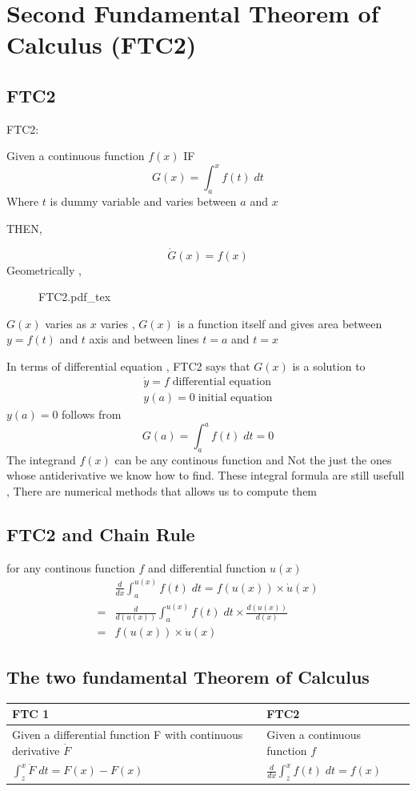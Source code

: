 \section{Second Fundamental Theorem of Calculus (FTC2)} 

\subsection{FTC2}
FTC2:

Given a continuous function $f(x)$ IF 
   \[
	G(x) = \int_{a}^{x} f(t) \; dt 
   \]
   Where $t$ is dummy variable and varies between $a$ and $x$ 

   THEN,

      \[
   	\dot{G}(x) = f(x)
      \]
      Geometrically , 
\begin{figure}[H]
	\centering
	\def\svgwidth{0.7\columnwidth}
	{FTC2.pdf_tex}
\end{figure}
$G(x)$ varies as $x$ varies , $G(x)$ is a function itself and gives 
area between $y =  f(t)$ and $t$ axis and between lines $t=a$ and $t=x$

In terms of differential equation , 
FTC2 says that $G(x)$ is a solution to 
   \begin{align*}
	\dot{y} = f \; \text{differential equation} \\
	y(a) = 0 \; \text{initial equation} 
   \end{align*}
   $y(a)= 0 $ follows from 
      \[
   	G(a) = \int_{a}^{a} f(t) \; dt = 0
      \]
The integrand $f(x)$ can be any continous function and Not  the just the 
ones whose antiderivative we know how to find. These integral formula are still usefull ,
There are numerical methods that allows us to compute them

\subsection{FTC2 and Chain Rule}
for any continous function $f$ and differential function $u(x)$ 
\begin{align*}
    &\frac{d}{dx} \int_{a}^{u(x)} f(t) \; dt = f(u(x)) \times \dot{u}(x) \\
    =& \frac{d}{d(u(x))} \int_{a}^{u(x)} f(t) \; dt \times \frac{d(u(x))}{d(x)}\\
    =& f(u(x)) \times \dot{u}(x)
\end{align*}

\subsection{The two fundamental Theorem of Calculus}
\begin{tabular}{l|l}
	\toprule
	FTC 1 & FTC2 \\
	\midrule
	Given a differential function F with continuous derivative $\dot{F}$ &               Given a continuous function $f$ \\
	$\int_{z}^{x} \dot{F} \; dt = F(x) - F(x)$                           & $\frac{d}{dx} \int_{z}^{x} f(t) \; dt = f(x)$\\
	\bottomrule
\end{tabular}

